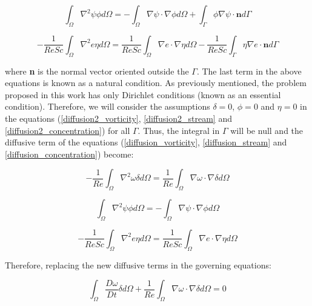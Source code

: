 \begin{equation} \label{diffusion2_stream} 
 \int_{\Omega} \nabla^2 \psi \phi d\Omega
 = - \int_{\Omega} \nabla \psi \cdot \nabla \phi d\Omega
   + \int_{\Gamma} \phi \nabla \psi \cdot \textbf{n} d\Gamma
\end{equation}

\begin{equation} \label{diffusion2_concentration} 
 - \frac{1}{\textit{ReSc}} \int_{\Omega} \nabla^2 e \eta d\Omega
 = \frac{1}{\textit{ReSc}} \int_{\Omega} \nabla e \cdot \nabla \eta d\Omega
 - \frac{1}{\textit{ReSc}} \int_{\Gamma} \eta \nabla e \cdot \textbf{n} d\Gamma
\end{equation}

\noindent
where \textbf{n} is the normal vector oriented outside the $\Gamma$. 
The last term in the above equations is known as a natural condition. 
As previously mentioned, 
the problem proposed in this work has only Dirichlet conditions 
(known as an essential condition).
Therefore,
we will consider the assumptions
$\delta = 0$, $\phi = 0$ and $\eta = 0$ in the equations (\ref{diffusion2_vorticity}, \ref{diffusion2_stream} and \ref{diffusion2_concentration})
for all $\Gamma$. 
Thus, 
the integral in $\Gamma$ will be null
and the diffusive term of the equations 
(\ref{diffusion_vorticity}, \ref{diffusion_stream} and \ref{diffusion_concentration}) become:

\begin{equation}
 - \frac{1}{\textit{Re}} \int_{\Omega} \nabla^2 \omega \delta d\Omega
 = \frac{1}{\textit{Re}} \int_{\Omega} \nabla \omega \cdot \nabla \delta d\Omega
\end{equation}

\begin{equation} 
 \int_{\Omega} \nabla^2 \psi \phi d\Omega
 = - \int_{\Omega} \nabla \psi \cdot \nabla \phi d\Omega
\end{equation}

\begin{equation} 
 - \frac{1}{\textit{ReSc}} \int_{\Omega} \nabla^2 e \eta d\Omega
 = \frac{1}{\textit{ReSc}} \int_{\Omega} \nabla e \cdot \nabla \eta d\Omega
\end{equation}

\medskip
\noindent
Therefore, replacing the new diffusive terms in the governing equations:

\begin{equation} \label{vorticity weak} 
   \int_{\Omega} \frac{D \omega}{Dt} \delta d\Omega 
 + \frac{1}{\textit{Re}} \int_{\Omega} \nabla \omega \cdot \nabla \delta d\Omega 
 = 0
\end{equation}

